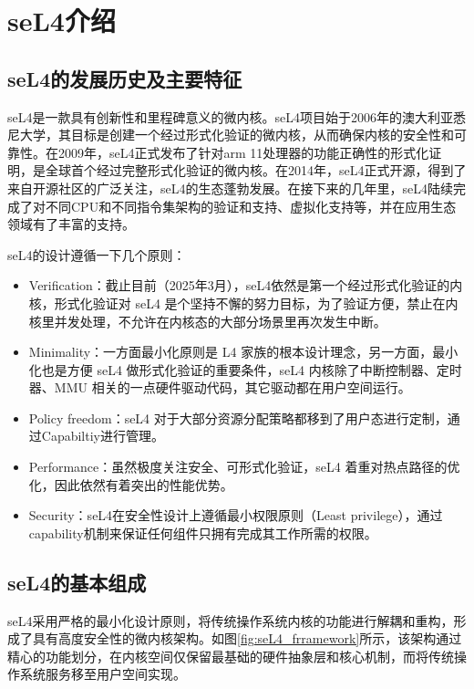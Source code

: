 \chapter{seL4介绍}
\label{chap:seL4_intro}
\section{seL4的发展历史及主要特征}
seL4是一款具有创新性和里程碑意义的微内核\cite{klein2009sel4}。seL4项目始于2006年的澳大利亚悉尼大学，其目标是创建一个经过形式化验证的微内核，从而确保内核的安全性和可靠性。在2009年，seL4正式发布了针对arm 11处理器的功能正确性的形式化证明\cite{klein2009sel4}，是全球首个经过完整形式化验证的微内核。在2014年，seL4正式开源，得到了来自开源社区的广泛关注，seL4的生态蓬勃发展。在接下来的几年里，seL4陆续完成了对不同CPU和不同指令集架构的验证和支持、虚拟化支持\cite{doran2023embedded}等，并在应用生态领域有了丰富的支持。

seL4的设计遵循一下几个原则\cite{sel4DesignPrinciples}： 
\begin{itemize}
  \item Verification：截止目前（2025年3月），seL4依然是第一个经过形式化验证的内核，形式化验证对 seL4 是个坚持不懈的努力目标，为了验证方便，禁止在内核里并发处理，不允许在内核态的大部分场景里再次发生中断。
  \item Minimality：一方面最小化原则是 L4 家族的根本设计理念，另一方面，最小化也是方便 seL4 做形式化验证的重要条件，seL4 内核除了中断控制器、定时器、MMU 相关的一点硬件驱动代码，其它驱动都在用户空间运行。
  \item Policy freedom：seL4 对于大部分资源分配策略都移到了用户态进行定制，通过Capabiltiy进行管理。
  \item Performance：虽然极度关注安全、可形式化验证，seL4 着重对热点路径的优化，因此依然有着突出的性能优势。
  \item Security：seL4在安全性设计上遵循最小权限原则（Least privilege），通过capability机制来保证任何组件只拥有完成其工作所需的权限。
\end{itemize}

\section{seL4的基本组成}
seL4采用严格的最小化设计原则，将传统操作系统内核的功能进行解耦和重构，形成了具有高度安全性的微内核架构。如图\ref{fig:seL4_frramework}所示，该架构通过精心的功能划分，在内核空间仅保留最基础的硬件抽象层和核心机制，而将传统操作系统服务移至用户空间实现。

